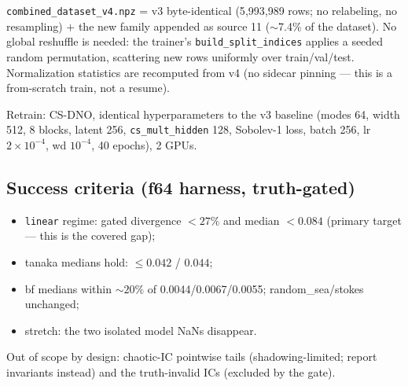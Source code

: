 \documentclass[11pt,letterpaper]{article}
\begin{document}
\texttt{combined\_dataset\_v4.npz} = v3 byte-identical (5{,}993{,}989 rows; no
relabeling, no resampling) $+$ the new family appended as source 11
($\sim$7.4\% of the dataset). No global reshuffle is needed: the trainer's
\texttt{build\_split\_indices} applies a seeded random permutation, scattering
new rows uniformly over train/val/test. Normalization statistics are recomputed
from v4 (no sidecar pinning --- this is a from-scratch train, not a resume).

Retrain: CS-DNO, identical hyperparameters to the v3 baseline (modes 64, width
512, 8 blocks, latent 256, \texttt{cs\_mult\_hidden} 128, Sobolev-1 loss, batch
256, lr $2\times10^{-4}$, wd $10^{-4}$, 40 epochs), 2 GPUs.

\subsection{Success criteria (f64 harness, truth-gated)}

\begin{itemize}[leftmargin=1.4em, itemsep=1pt]
\item \texttt{linear} regime: gated divergence $<27\%$ and median $<0.084$
      (primary target --- this is the covered gap);
\item tanaka medians hold: $\le 0.042$ / $0.044$;
\item bf medians within $\sim20\%$ of 0.0044/0.0067/0.0055; random\_sea/stokes
      unchanged;
\item stretch: the two isolated model NaNs disappear.
\end{itemize}

Out of scope by design: chaotic-IC pointwise tails (shadowing-limited;
report invariants instead) and the truth-invalid ICs (excluded by the gate).
\end{document}
